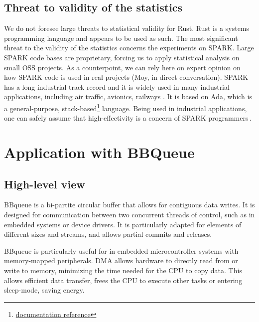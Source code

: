 \documentclass[nomenclature, english, bibtex]{kththesis}
\begin{document}
\subsection{Threat to validity of the statistics}

We do not foresee large threats to statistical validity for Rust. Rust is a systems programming language and appears to be used as such. The most significant threat to the validity of the statistics concerns the experiments on SPARK. Large SPARK code bases are proprietary, forcing us to apply statistical analysis on small \gls{OSS} projects. As a counterpoint, we can rely here on expert opinion on how SPARK code is used in real projects (Moy, in direct conversation). SPARK has a long industrial track record and it is widely used in many industrial applications, including air traffic, avionics, railways \etc. It is based on Ada, which is a general-purpose, stack-based\footnote{\href{https://www.adacore.com/uploads/books/pdf/AdaCore-Tech-Cyber-Security-web.pdf}{documentation reference}} language. Being used in industrial applications, one can safely assume that high-effectivity is a concern of SPARK programmers\,\cite{chapman_adacore_2018}.

\section[BBqueue]{Application with BBQueue}
\label{sec:methodBBQueue}
\subsection{High-level view}
BBqueue is a bi-partite circular buffer that allows for contiguous data writes. It is designed for communication between two concurrent threads of control, such as in embedded systems or device drivers. It is particularly adapted for elements of different sizes and streams, and allows partial commits and releases.

BBqueue is particularly useful for  in embedded microcontroller systems with memory-mapped peripherals. DMA allows hardware to directly read from or write to memory, minimizing the time needed for the CPU to copy data. This allows efficient data transfer, frees the CPU to execute other tasks or entering sleep-mode, saving energy.
\end{document}
